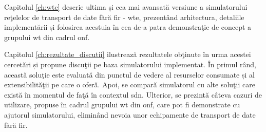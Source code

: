 Capitolul \ref{ch:wte} descrie ultima și cea mai avansată versiune a simulatorului reţelelor de transport de date fără fir - \gls{wte}, prezentând arhitectura, detaliile implementării și folosirea acestuia în cea de-a patra demonstraţie de concept a grupului \gls{wt} din cadrul \gls{onf}.

Capitolul \ref{ch:rezultate_discutii} ilustrează rezultatele obţinute în urma acestei cercetări și propune discuţii pe baza simulatorului implementat. În primul rând, această soluţie este evaluată din punctul de vedere al resurselor consumate și al extensibilităţii pe care o oferă. Apoi, se compară simulatorul cu alte soluţii care există în momentul de faţă în contextul \gls{sdn}. Ulterior, se prezintă câteva cazuri de utilizare, propuse în cadrul grupului \gls{wt} din \gls{onf}, care pot fi demonstrate cu ajutorul simulatorului, eliminând nevoia unor echipamente de transport de date fără fir.

